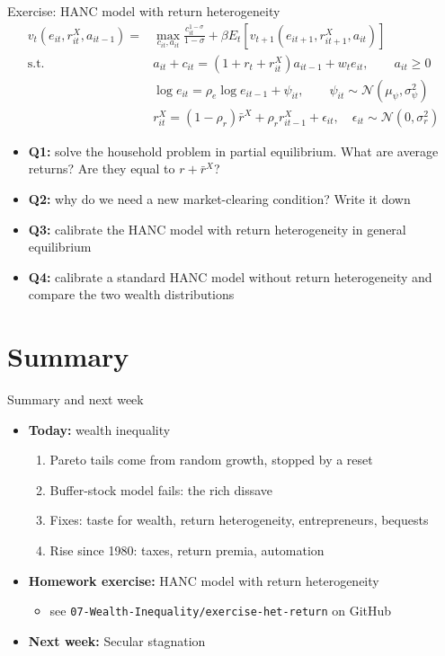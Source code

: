 \documentclass[10pt,english,10pt,handout]{beamer}
\begin{document}
\begin{frame}{Exercise: HANC model with return heterogeneity}
\[
\begin{aligned}v_{t}(e_{it},r_{it}^{X},a_{it-1})= & \max_{c_{it},a_{it}}\frac{c_{it}^{1-\sigma}}{1-\sigma}+\beta E_{t}\left[v_{t+1}(e_{it+1},r_{it+1}^{X},a_{it})\right]\\
\text{s.t.}\quad & a_{it}+c_{it}=(1+r_{t}+r_{it}^{X})a_{it-1}+w_{t}e_{it},\qquad a_{it}\geq0\\
 & \log e_{it}=\rho_{e}\log e_{it-1}+\psi_{it},\qquad\psi_{it}\sim\mathcal{N}(\mu_{\psi},\sigma_{\psi}^{2})\\
 & r_{it}^{X}=(1-\rho_{r})\bar{r}^{X}+\rho_{r}r_{it-1}^{X}+\epsilon_{it},\quad\epsilon_{it}\sim\mathcal{N}(0,\sigma_{r}^{2})
\end{aligned}
\]
\begin{itemize}
\item \textbf{Q1:} solve the household problem in partial equilibrium. What are average returns? Are they equal to $r+\bar{r}^{X}$?
\item \textbf{Q2:} why do we need a new market-clearing condition? Write it down
\item \textbf{Q3:} calibrate the HANC model with return heterogeneity in general equilibrium
\item \textbf{Q4:} calibrate a standard HANC model without return heterogeneity and compare the two wealth distributions
\end{itemize}
\end{frame}

\section{Summary}

\begin{frame}{Summary and next week}
\begin{itemize}
\item \textbf{Today:} wealth inequality
\begin{enumerate}
\item Pareto tails come from random growth, stopped by a reset
\item Buffer-stock model fails: the rich dissave
\item Fixes: taste for wealth, return heterogeneity, entrepreneurs, bequests
\item Rise since 1980: taxes, return premia, automation
\end{enumerate}
\item \textbf{Homework exercise:} HANC model with return heterogeneity
\begin{itemize}
\item see \texttt{07-Wealth-Inequality/exercise-het-return} on GitHub
\end{itemize}
\item \textbf{Next week:} Secular stagnation
\end{itemize}
\end{frame}
\end{document}
